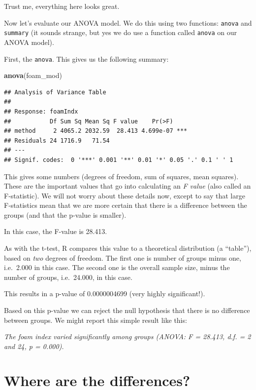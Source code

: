 \documentclass[
  a4paperpaper,
]{book}
\newenvironment{Shaded}{\begin{snugshade}}{\end{snugshade}}
\newcommand{\KeywordTok}[1]{\textcolor[rgb]{0.13,0.29,0.53}{\textbf{#1}}}
\newcommand{\NormalTok}[1]{#1}
\begin{document}
Trust me, everything here looks great.

Now let's evaluate our ANOVA model. We do this using two functions: \texttt{anova} and \texttt{summary} (it sounds strange, but yes we do use a function called \texttt{anova} on our ANOVA model).

First, the \texttt{anova}. This gives us the following summary:

\begin{Shaded}
\begin{Highlighting}[]
\KeywordTok{anova}\NormalTok{(foam\_mod)}
\end{Highlighting}
\end{Shaded}

\begin{verbatim}
## Analysis of Variance Table
## 
## Response: foamIndx
##           Df Sum Sq Mean Sq F value    Pr(>F)    
## method     2 4065.2 2032.59  28.413 4.699e-07 ***
## Residuals 24 1716.9   71.54                      
## ---
## Signif. codes:  0 '***' 0.001 '**' 0.01 '*' 0.05 '.' 0.1 ' ' 1
\end{verbatim}

This gives some numbers (degrees of freedom, sum of squares, mean squares). These are the important values that go into calculating an \emph{F value} (also called an F-statistic). We will not worry about these details now, except to say that large F-statistics mean that we are more certain that there is a difference between the groups (and that the p-value is smaller).

In this case, the F-value is 28.413.

As with the t-test, R compares this value to a theoretical distribution (a ``table''), based on \emph{two} degrees of freedom. The first one is number of groups minus one, i.e.~2.000 in this case. The second one is the overall sample size, minus the number of groups, i.e.~24.000, in this case.

This results in a p-value of 0.0000004699 (very highly significant!).

Based on this p-value we can reject the null hypothesis that there is no difference between groups. We might report this simple result like this:

\emph{The foam index varied significantly among groups (ANOVA: F = 28.413, d.f. = 2 and 24, p = 0.000).}

\hypertarget{where-are-the-differences}{%
\section{Where are the differences?}\label{where-are-the-differences}}
\end{document}
